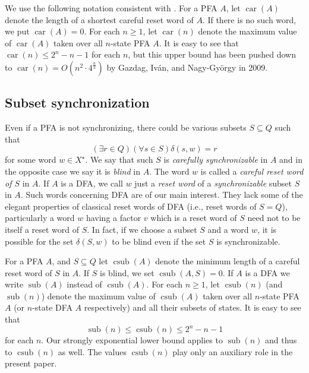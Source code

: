 \documentclass{ws-ijmpc}
\DeclareMathOperator{\car}{car}
\DeclareMathOperator{\sub}{sub}
\DeclareMathOperator{\csub}{csub}
\begin{document}
We use the following notation consistent with \citep{MAR5}. For a
PFA $A$, let $\car\!\left(A\right)$ denote the length of a shortest
careful reset word of $A$. If there is no such word, we put $\car\!\left(A\right)=0$.
For each $n\ge1$, let $\car\!\left(n\right)$ denote the maximum
value of $\car\!\left(A\right)$ taken over all $n$-state PFA $A$.
It is easy to see that $\car\!\left(n\right)\le2^{n}-n-1$ for each
$n$, but this upper bound has been pushed down to $\car\!\left(n\right)=O\left(n^{2}\cdot4^{\frac{n}{3}}\right)$
by Gazdag, Iv\'an, and Nagy-Gy\"{o}rgy \citep{GAZ1} in 2009.


\subsection{Subset synchronization}

Even if a PFA is not synchronizing, there could be various subsets
$S\subseteq Q$ such that 
\[
\left(\exists r\in Q\right)\left(\forall s\in S\right)\delta\!\left(s,w\right)=r
\]
for some word $w\in X^{\star}$. We say that such $S$ is \emph{carefully
synchronizable} in\emph{ }$A$ and in the opposite case we say it
is \emph{blind }in \emph{$A$}. The word $w$ is called a \emph{careful
reset word of $S$ }in \emph{$A$}. If $A$ is a DFA, we call $w$
just a \emph{reset word} of a \emph{synchronizable} subset $S$ in
$A$. Such words concerning DFA are of our main interest. They lack
some of the elegant properties of classical reset words of DFA (i.e.,
reset words of $S=Q$), particularly a word $w$ having a factor $v$
which is a reset word of $S$ need not to be itself a reset word of
$S$. In fact, if we choose a subset $S$ and a word $w$, it is possible
for the set $\delta\!\left(S,w\right)$ to be blind even if the set
$S$ is synchronizable.

For a PFA $A$, and $S\subseteq Q$ let $\csub\!\left(A\right)$ denote
the minimum length of a careful reset word of $S$ in $A$. If $S$
is blind, we set $\csub\!\left(A,S\right)=0$. If $A$ is a DFA we
write $\sub\!\left(A\right)$ instead of $\csub\!\left(A\right)$.
For each $n\ge1$, let $\csub\!\left(n\right)$ (and $\sub\!\left(n\right)$)
denote the maximum value of $\csub\!\left(A\right)$ taken over all
$n$-state PFA $A$ (or $n$-state DFA $A$ respectively) and all
their subsets of states. It is easy to see that 
\[
\sub\!\left(n\right)\le\csub\!\left(n\right)\le2^{n}-n-1
\]
for each $n$. Our strongly exponential lower bound applies to $\sub\!\left(n\right)$
and thus to $\csub\!\left(n\right)$ as well. The values $\csub\!\left(n\right)$
play only an auxiliary role in the present paper. 
\end{document}
